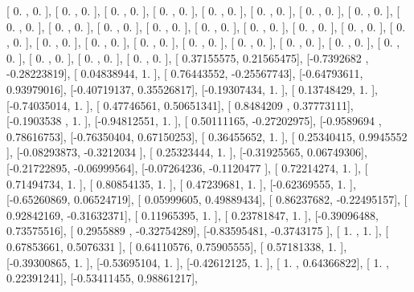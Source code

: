 \documentclass{article}
\begin{document}
       [ 0.        ,  0.        ],
       [ 0.        ,  0.        ],
       [ 0.        ,  0.        ],
       [ 0.        ,  0.        ],
       [ 0.        ,  0.        ],
       [ 0.        ,  0.        ],
       [ 0.        ,  0.        ],
       [ 0.        ,  0.        ],
       [ 0.        ,  0.        ],
       [ 0.        ,  0.        ],
       [ 0.        ,  0.        ],
       [ 0.        ,  0.        ],
       [ 0.        ,  0.        ],
       [ 0.        ,  0.        ],
       [ 0.        ,  0.        ],
       [ 0.        ,  0.        ],
       [ 0.        ,  0.        ],
       [ 0.        ,  0.        ],
       [ 0.        ,  0.        ],
       [ 0.        ,  0.        ],
       [ 0.        ,  0.        ],
       [ 0.        ,  0.        ],
       [ 0.        ,  0.        ],
       [ 0.        ,  0.        ],
       [ 0.        ,  0.        ],
       [ 0.        ,  0.        ],
       [ 0.        ,  0.        ],
       [ 0.        ,  0.        ],
       [ 0.37155575,  0.21565475],
       [-0.7392682 , -0.28223819],
       [ 0.04838944,  1.        ],
       [ 0.76443552, -0.25567743],
       [-0.64793611,  0.93979016],
       [-0.40719137,  0.35526817],
       [-0.19307434,  1.        ],
       [ 0.13748429,  1.        ],
       [-0.74035014,  1.        ],
       [ 0.47746561,  0.50651341],
       [ 0.8484209 ,  0.37773111],
       [-0.1903538 ,  1.        ],
       [-0.94812551,  1.        ],
       [ 0.50111165, -0.27202975],
       [-0.9589694 ,  0.78616753],
       [-0.76350404,  0.67150253],
       [ 0.36455652,  1.        ],
       [ 0.25340415,  0.9945552 ],
       [-0.08293873, -0.3212034 ],
       [ 0.25323444,  1.        ],
       [-0.31925565,  0.06749306],
       [-0.21722895, -0.06999564],
       [-0.07264236, -0.1120477 ],
       [ 0.72214274,  1.        ],
       [ 0.71494734,  1.        ],
       [ 0.80854135,  1.        ],
       [ 0.47239681,  1.        ],
       [-0.62369555,  1.        ],
       [-0.65260869,  0.06524719],
       [ 0.05999605,  0.49889434],
       [ 0.86237682, -0.22495157],
       [ 0.92842169, -0.31632371],
       [ 0.11965395,  1.        ],
       [ 0.23781847,  1.        ],
       [-0.39096488,  0.73575516],
       [ 0.2955889 , -0.32754289],
       [-0.83595481, -0.3743175 ],
       [ 1.        ,  1.        ],
       [ 0.67853661,  0.5076331 ],
       [ 0.64110576,  0.75905555],
       [ 0.57181338,  1.        ],
       [-0.39300865,  1.        ],
       [-0.53695104,  1.        ],
       [-0.42612125,  1.        ],
       [ 1.        ,  0.64366822],
       [ 1.        ,  0.22391241],
       [-0.53411455,  0.98861217],
\end{document}
